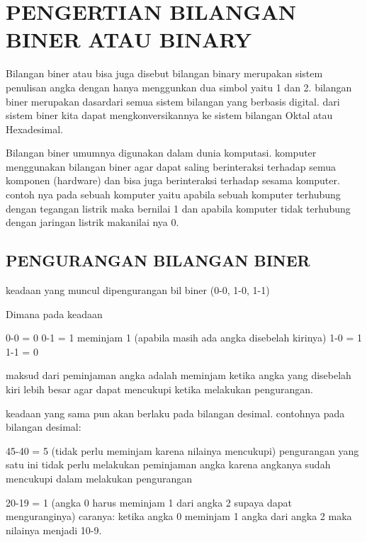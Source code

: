 \chapter{PENGERTIAN BILANGAN BINER ATAU BINARY}

Bilangan biner atau bisa juga disebut bilangan binary merupakan sistem penulisan angka dengan hanya menggunkan dua simbol yaitu 1 dan 2. bilangan biner merupakan dasardari semua sistem bilangan yang berbasis digital. dari sistem biner kita dapat mengkonversikannya ke sistem bilangan Oktal atau Hexadesimal.

Bilangan biner umumnya digunakan dalam dunia komputasi. komputer menggunakan bilangan biner agar dapat saling berinteraksi terhadap semua komponen (hardware) dan bisa juga berinteraksi terhadap sesama komputer. contoh nya pada sebuah komputer yaitu apabila sebuah komputer terhubung dengan tegangan listrik maka bernilai 1 dan apabila komputer tidak terhubung dengan jaringan listrik makanilai nya 0.

\section{PENGURANGAN BILANGAN BINER}

keadaan yang muncul dipengurangan bil biner
(0-0, 1-0, 1-1)

Dimana pada keadaan

	0-0 = 0
	0-1 = 1 meminjam 1 (apabila masih ada angka disebelah kirinya)
	1-0 = 1
	1-1 = 0
	
maksud dari peminjaman angka adalah meminjam ketika angka yang disebelah kiri lebih besar agar dapat mencukupi ketika melakukan pengurangan.

keadaan yang sama pun akan berlaku pada bilangan desimal.
contohnya pada bilangan desimal:

	45-40 = 5 (tidak perlu meminjam karena nilainya mencukupi)
pengurangan yang satu ini tidak perlu melakukan peminjaman angka karena angkanya sudah mencukupi dalam melakukan pengurangan
				
	20-19 = 1 (angka 0 harus meminjam 1 dari angka 2 supaya dapat menguranginya)
		caranya: ketika angka 0 meminjam 1 angka dari angka 2 maka nilainya menjadi 10-9.
